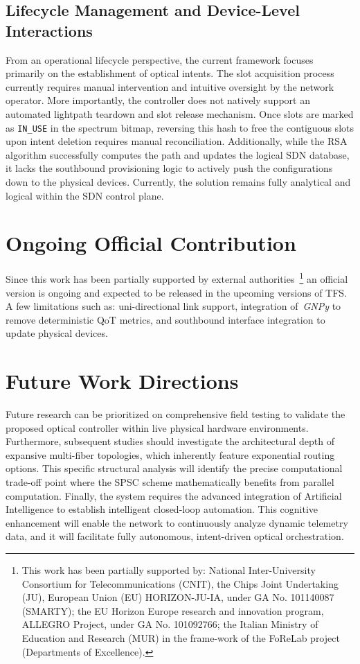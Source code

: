\documentclass[12pt, a4paper, twoside, openright]{report}
\begin{document}
\subsection{ Lifecycle Management and Device-Level Interactions}
From an operational lifecycle perspective, the current framework focuses primarily on the establishment of optical intents. The slot acquisition process currently requires manual intervention and intuitive oversight by the network operator. More importantly, the controller does not natively support an automated lightpath teardown and slot release mechanism. Once slots are marked as \texttt{IN\_USE} in the spectrum bitmap, reversing this hash to free the contiguous slots upon intent deletion requires manual reconciliation. Additionally, while the RSA algorithm successfully computes the path and updates the logical SDN database, it lacks the southbound provisioning logic to actively push the configurations down to the physical devices. Currently, the solution remains fully analytical and logical within the SDN control plane.
\section{Ongoing Official Contribution}
Since this work has been partially supported by external authorities~\footnote{This work has been partially supported by: National Inter-University Consortium for Telecommunications (CNIT), the Chips Joint Undertaking (JU), European Union (EU) HORIZON-JU-IA, under GA No. 101140087 (SMARTY); the EU Horizon Europe research and innovation program, ALLEGRO Project, under GA No. 101092766; the Italian Ministry of Education and Research (MUR) in the frame-work of the FoReLab project (Departments of Excellence).} an official version is ongoing and expected to be released in the upcoming versions of TFS. A few limitations such as: uni-directional link support, integration of~\emph{GNPy} to remove deterministic QoT metrics, and southbound interface integration to update physical devices.
\section{Future Work Directions}
Future research can be prioritized on comprehensive field testing to validate the proposed optical controller within live physical hardware environments. Furthermore, subsequent studies should investigate the architectural depth of expansive multi-fiber topologies, which inherently feature exponential routing options. This specific structural analysis will identify the precise computational trade-off point where the SPSC scheme mathematically benefits from parallel computation. Finally, the system requires the advanced integration of Artificial Intelligence to establish intelligent closed-loop automation. This cognitive enhancement will enable the network to continuously analyze dynamic telemetry data, and it will facilitate fully autonomous, intent-driven optical orchestration.
\clearpage
{}
\printbibliography
\end{document}
